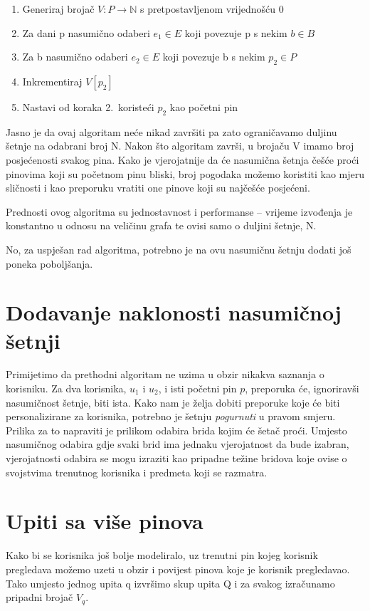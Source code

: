 \documentclass[times, utf8, seminar]{fer}
\begin{document}
\begin{enumerate}
	\item Generiraj brojač $V: P \to \mathbb{N}$ s pretpostavljenom vrijednošću 0
	\item Za dani p nasumično odaberi $e_1 \in E$ koji povezuje p s nekim $b \in B$
	\item Za b nasumično odaberi $e_2 \in E$ koji povezuje b s nekim $p_2 \in P$
	\item Inkrementiraj $V[p_2]$
	\item Nastavi od koraka 2.\ koristeći $p_2$ kao početni pin
\end{enumerate}

Jasno je da ovaj algoritam neće nikad završiti pa zato ograničavamo duljinu šetnje na odabrani broj N. Nakon što algoritam završi, u brojaču V imamo broj posjećenosti svakog pina. Kako je vjerojatnije da će nasumična šetnja češće proći pinovima koji su početnom pinu bliski, broj pogodaka možemo koristiti kao mjeru sličnosti i kao preporuku vratiti one pinove koji su najčešće posjećeni.

Prednosti ovog algoritma su jednostavnost i performanse -- vrijeme izvođenja je konstantno u odnosu na veličinu grafa te ovisi samo o duljini šetnje, N.

No, za uspješan rad algoritma, potrebno je na ovu nasumičnu šetnju dodati još poneka poboljšanja.

\section{Dodavanje naklonosti nasumičnoj šetnji}

Primijetimo da prethodni algoritam ne uzima u obzir nikakva saznanja o korisniku. Za dva korisnika, $u_1$ i $u_2$, i isti početni pin $p$, preporuka će, ignoriravši nasumičnost šetnje, biti ista. Kako nam je želja dobiti preporuke koje će biti personalizirane za korisnika, potrebno je šetnju \textit{pogurnuti} u pravom smjeru. Prilika za to napraviti je prilikom odabira brida kojim će šetač proći. Umjesto nasumičnog odabira gdje svaki brid ima jednaku vjerojatnost da bude izabran, vjerojatnosti odabira se mogu izraziti kao pripadne težine bridova koje ovise o svojstvima trenutnog korisnika i predmeta koji se razmatra.

\section{Upiti sa više pinova}

Kako bi se korisnika još bolje modeliralo, uz trenutni pin kojeg korisnik pregledava možemo uzeti u obzir i povijest pinova koje je korisnik pregledavao. Tako umjesto jednog upita q izvršimo skup upita Q i za svakog izračunamo pripadni brojač $V_q$.
\end{document}
